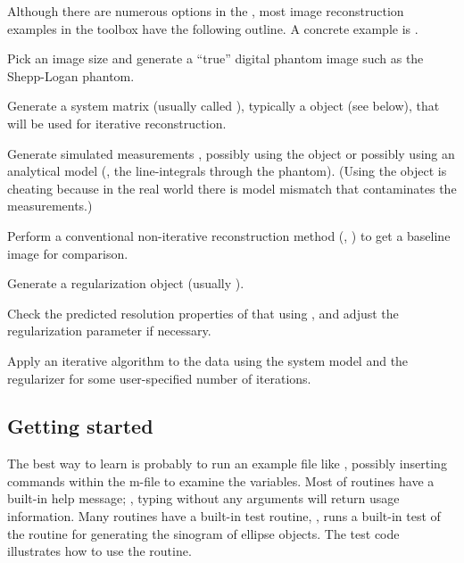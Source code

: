 
Although there are numerous options
in the \irt,
most image reconstruction examples
in the toolbox
have the following outline.
A concrete example
is .

\blist
\item
Pick an image size
and generate a ``true'' digital phantom image
such as the Shepp-Logan phantom.
\item
Generate a system matrix
(usually called ),
typically a \fatrixx object (see below),
that will be used for iterative reconstruction.
\item
Generate simulated measurements ,
possibly using the \fatrixx object
or possibly using an analytical model
(\eg, the line-integrals through the phantom).
(Using the \fatrixx object
is cheating because in the real world
there is model mismatch that contaminates the measurements.)
\item
Perform a conventional non-iterative reconstruction method
(\eg, )
to get a baseline image for comparison.
\item
Generate a regularization object
(usually ).
\item
Check the predicted resolution properties
of that 
using ,
and adjust the regularization parameter \bet
if necessary.
\item
Apply an iterative algorithm
to the data 
using the system model  and the regularizer 
for some user-specified number of iterations.
\elist


\subsection{Getting started}

The best way to learn
is probably to run an example file
like
,
possibly
inserting  commands
within the m-file
to examine the variables.
Most of \irt routines
have a built-in help message;
\eg,
typing 
without any arguments
will return usage information.
Many \irt routines
have a built-in test routine,
\eg,
runs a built-in test
of the routine for generating
the sinogram of ellipse objects.
The test code illustrates
how to use the routine.
